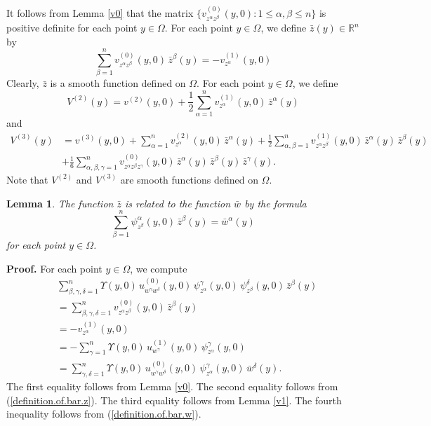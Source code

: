 \documentclass[11pt]{amsart}
\newtheorem{lemma}[theorem]{Lemma}
\theoremstyle{definition}
\begin{document}
It follows from Lemma \ref{v0} that the matrix $\{v^{(0)}_{z^\alpha z^\beta}(y,0): 1 \leq \alpha,\beta \leq n\}$ is positive definite for each point $y \in \Omega$. For each point $y \in \Omega$, we define $\bar{z}(y) \in \mathbb{R}^n$ by 
\begin{equation} 
\label{definition.of.bar.z}
\sum_{\beta=1}^n v^{(0)}_{z^\alpha z^\beta}(y,0) \, \bar{z}^\beta(y) = -v^{(1)}_{z^\alpha}(y,0) 
\end{equation}
Clearly, $\bar{z}$ is a smooth function defined on $\Omega$. For each point $y \in \Omega$, we define 
\[V^{(2)}(y) = v^{(2)}(y,0) + \frac{1}{2} \sum_{\alpha=1}^n v^{(1)}_{z^\alpha}(y,0) \, \bar{z}^\alpha(y)\] 
and 
\begin{align*} 
V^{(3)}(y) 
&= v^{(3)}(y,0) + \sum_{\alpha=1}^n v^{(2)}_{z^\alpha}(y,0) \, \bar{z}^\alpha(y) + \frac{1}{2} \sum_{\alpha,\beta=1}^n v^{(1)}_{z^\alpha z^\beta}(y,0) \, \bar{z}^\alpha(y) \, \bar{z}^\beta(y) \\ 
&+ \frac{1}{6} \sum_{\alpha,\beta,\gamma=1}^n v^{(0)}_{z^\alpha z^\beta z^\gamma}(y,0) \, \bar{z}^\alpha(y) \, \bar{z}^\beta(y) \, \bar{z}^\gamma(y). 
\end{align*}
Note that $V^{(2)}$ and $V^{(3)}$ are smooth functions defined on $\Omega$.


\begin{lemma}
\label{relation.between.bar.w.and.bar.z}
The function $\bar{z}$ is related to the function $\bar{w}$ by the formula 
\[\sum_{\beta=1}^n \psi^\alpha_{z^\beta}(y,0) \, \bar{z}^\beta(y) = \bar{w}^\alpha(y)\] 
for each point $y \in \Omega$.
\end{lemma}

\textbf{Proof.} 
For each point $y \in \Omega$, we compute 
\begin{align*} 
&\sum_{\beta,\gamma,\delta=1}^n \Upsilon(y,0) \, u^{(0)}_{w^\gamma w^\delta}(y,0) \, \psi^\gamma_{z^\alpha}(y,0) \, \psi^\delta_{z^\beta}(y,0) \, \bar{z}^\beta(y) \\ 
&= \sum_{\beta,\gamma,\delta=1}^n v^{(0)}_{z^\alpha z^\beta}(y,0) \, \bar{z}^\beta(y) \\ 
&= -v^{(1)}_{z^\alpha}(y,0) \\ 
&= -\sum_{\gamma=1}^n \Upsilon(y,0) \, u^{(1)}_{w^\gamma}(y,0) \, \psi^\gamma_{z^\alpha}(y,0) \\ 
&= \sum_{\gamma,\delta=1}^n \Upsilon(y,0) \, u^{(0)}_{w^\gamma w^\delta}(y,0) \, \psi^\gamma_{z^\alpha}(y,0) \, \bar{w}^\delta(y). 
\end{align*} 
The first equality follows from Lemma \ref{v0}. The second equality follows from (\ref{definition.of.bar.z}). The third equality follows from Lemma \ref{v1}. The fourth inequality follows from (\ref{definition.of.bar.w}). 
\end{document}
